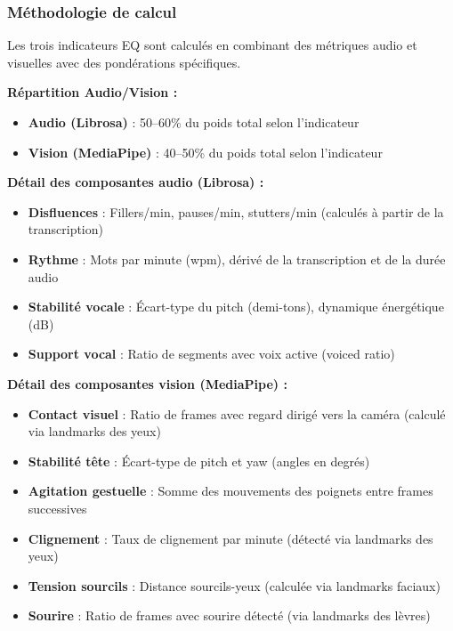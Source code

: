 \documentclass[12pt,a4paper]{article}
\begin{document}
\subsubsection{Méthodologie de calcul}

Les trois indicateurs EQ sont calculés en combinant des métriques audio et visuelles avec des pondérations spécifiques.

\textbf{Répartition Audio/Vision :}
\begin{itemize}
    \item \textbf{Audio (Librosa)} : 50--60\% du poids total selon l'indicateur
    \item \textbf{Vision (MediaPipe)} : 40--50\% du poids total selon l'indicateur
\end{itemize}

\textbf{Détail des composantes audio (Librosa) :}
\begin{itemize}
    \item \textbf{Disfluences} : Fillers/min, pauses/min, stutters/min (calculés à partir de la transcription)
    \item \textbf{Rythme} : Mots par minute (wpm), dérivé de la transcription et de la durée audio
    \item \textbf{Stabilité vocale} : Écart-type du pitch (demi-tons), dynamique énergétique (dB)
    \item \textbf{Support vocal} : Ratio de segments avec voix active (voiced ratio)
\end{itemize}

\textbf{Détail des composantes vision (MediaPipe) :}
\begin{itemize}
    \item \textbf{Contact visuel} : Ratio de frames avec regard dirigé vers la caméra (calculé via landmarks des yeux)
    \item \textbf{Stabilité tête} : Écart-type de pitch et yaw (angles en degrés)
    \item \textbf{Agitation gestuelle} : Somme des mouvements des poignets entre frames successives
    \item \textbf{Clignement} : Taux de clignement par minute (détecté via landmarks des yeux)
    \item \textbf{Tension sourcils} : Distance sourcils-yeux (calculée via landmarks faciaux)
    \item \textbf{Sourire} : Ratio de frames avec sourire détecté (via landmarks des lèvres)
\end{itemize}
\end{document}
